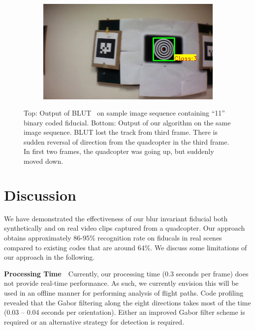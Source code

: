 \documentclass[10pt,twocolumn,letterpaper]{article}
\begin{document}
\begin{figure}
\begin{subfigure}[b]{.19\textwidth}
\end{subfigure}
\begin{subfigure}[b]{.19\textwidth}
\includegraphics[width=\linewidth]{BLUT_input_11/output6.jpg}
\end{subfigure}
\caption{Top: Output of BLUT~\cite{Wu:2011} on sample image sequence containing
``11'' binary coded fiducial. Bottom: Output of our algorithm on the same image
sequence. BLUT lost the track from third frame. There is sudden reversal of
direction from the quadcopter in the third frame. In first two frames, the quadcopter was
going up, but suddenly moved down.}
\label{fig:BLUT_compare_11}
\end{figure}

\section{Discussion}\label{sec:discussion}

We have demonstrated the effectiveness of our blur invariant fiducial both
synthetically and on real video clips captured from a quadcopter.   Our approach obtains
approximately 86-95\% recognition rate on fiducals in real scenes compared to existing codes
that are around 64\%.  We discuss some limitations of our approach in the following.

\noindent\textbf{Processing Time}~~Currently, our processing time (0.3 seconds
per frame) does not provide real-time performance.  As such, we currently
envision this will be used in an offline manner for performing analysis of
flight paths. Code profiling revealed that the Gabor filtering along the eight
directions takes most of the time (0.03 -- 0.04 seconds per orientation).  Either an
improved Gabor filter scheme is required or an alternative strategy for
detection is required.
\end{document}
